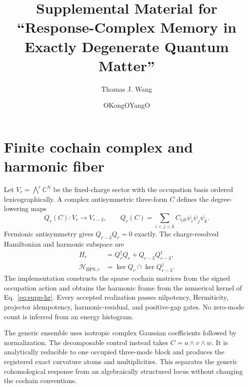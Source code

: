 \documentclass[aps,prl,onecolumn,superscriptaddress,longbibliography,floatfix]{revtex4-2}
\newcommand{\cH}{\mathcal H}
\begin{document}
\title{Supplemental Material for ``Response-Complex Memory in Exactly Degenerate Quantum Matter''}

\author{Thomas J. Wang}

\author{OKongOYangO}

\maketitle

\section{Finite cochain complex and harmonic fiber}
\label{sec:supp-cochain}

Let \(V_r=\bigwedge^r\mathbb C^N\) be the fixed-charge sector with the occupation basis ordered lexicographically. A complex antisymmetric three-form \(C\) defines the degree-lowering maps
\begin{equation}
 Q_r(C):V_r\longrightarrow V_{r-3},\qquad Q_r(C)=\sum_{i<j<k}C_{ijk}\psi_i\psi_j\psi_k.
 \label{eq:supp-qr}
\end{equation}
Fermionic antisymmetry gives \(Q_{r-3}Q_r=0\) exactly. The charge-resolved Hamiltonian and harmonic subspace are
\begin{align}
 H_r&=Q_r^\dagger Q_r+Q_{r-3}Q_{r-3}^\dagger,\label{eq:supp-hr}\\
 \cH_{\mathrm{BPS},r}&=\ker Q_r\cap\ker Q_{r-3}^\dagger.
 \label{eq:supp-harmonic}
\end{align}
The implementation constructs the sparse cochain matrices from the signed occupation action and obtains the harmonic frame from the numerical kernel of Eq.~\eqref{eq:supp-hr}. Every accepted realization passes nilpotency, Hermiticity, projector idempotency, harmonic-residual, and positive-gap gates. No zero-mode count is inferred from an energy histogram.

The generic ensemble uses isotropic complex Gaussian coefficients followed by normalization. The decomposable control instead takes \(C=u\wedge v\wedge w\). It is analytically reducible to one occupied three-mode block and produces the registered exact curvature atoms and multiplicities. This separates the generic cohomological response from an algebraically structured locus without changing the cochain conventions.
\end{document}
